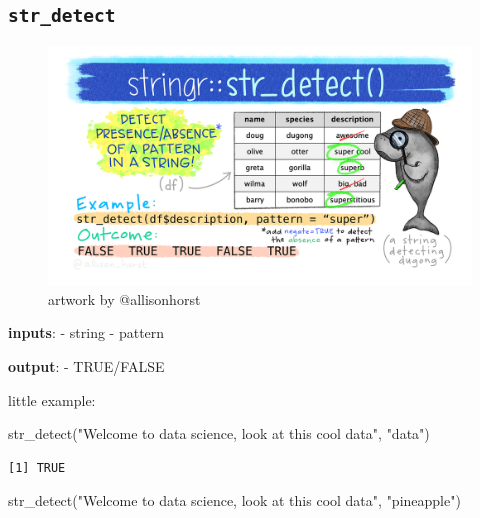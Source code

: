 \documentclass[
  letterpaper,
  DIV=11,
  numbers=noendperiod]{scrartcl}
\newenvironment{Shaded}{\begin{snugshade}}{\end{snugshade}}
\newcommand{\FunctionTok}[1]{\textcolor[rgb]{0.28,0.35,0.67}{#1}}
\newcommand{\NormalTok}[1]{\textcolor[rgb]{0.00,0.23,0.31}{#1}}
\newcommand{\StringTok}[1]{\textcolor[rgb]{0.13,0.47,0.30}{#1}}
\begin{document}
\hypertarget{str_detect}{%
\subsection{\texorpdfstring{\texttt{str\_detect}}{str\_detect}}\label{str_detect}}

\begin{figure}

{\centering \includegraphics{118_stringr_files/mediabag/813129dc-25e9-4ea3-9.png}

}

\caption{artwork by @allisonhorst}

\end{figure}

\textbf{inputs}: - string - pattern

\textbf{output}: - TRUE/FALSE

little example:

\begin{Shaded}
\begin{Highlighting}[]
\FunctionTok{str\_detect}\NormalTok{(}\StringTok{"Welcome to data science, look at this cool data"}\NormalTok{, }\StringTok{"data"}\NormalTok{)}
\end{Highlighting}
\end{Shaded}

\begin{verbatim}
[1] TRUE
\end{verbatim}

\begin{Shaded}
\begin{Highlighting}[]
\FunctionTok{str\_detect}\NormalTok{(}\StringTok{"Welcome to data science, look at this cool data"}\NormalTok{, }\StringTok{"pineapple"}\NormalTok{)}
\end{Highlighting}
\end{Shaded}
\end{document}
